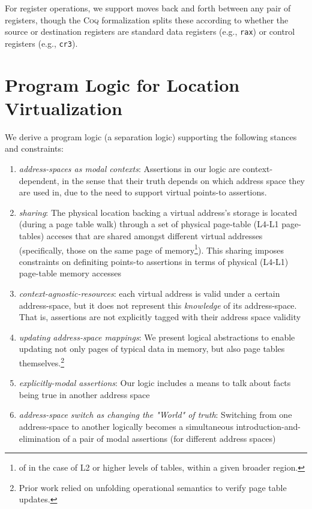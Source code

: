\documentclass[acmsmall,screen,nonacm]{acmart}
\newcommand{\singletonMap}[2]{[#1 := #2]}
\newcommand{\coq}{\textsc{Coq}\xspace}
\begin{document}
For register operations, we support moves back and forth between any pair of registers, though the \coq formalization splits these according to whether
the source or destination registers are standard data registers (e.g., \lstinline|rax|) or control registers (e.g., \lstinline|cr3|).
%
%
%
%
%
%
%
%
%
%
%
%
%
%
%
%
%
%
%
%
%
\section{Program Logic for Location Virtualization}
\label{sec:logic}
%
\newcommand{\gammaPred}{\delta}
\newcommand{\gammaPreds}{\delta\textsf{s}}
\newcommand{\rtv}{\textsf{rtv}}
\newcommand{\qone}{\texttt{q1}}
\newcommand{\qtwo}{\texttt{q2}}
\newcommand{\qthree}{\texttt{q3}}
\newcommand{\qfour}{\texttt{q4}}

\newcommand{\sumwalkabs}[3]{
  \ownGhost\gammaPred{\authfrag{\singletonMap{#1}{(#2, #3)}}}
}

\newcommand{\sumapaces}[2]{
  \ownGhost\gammaPreds{\authfrag{\singletonMap{#1}{#2}}}
}
\newcommand{\ptableabswalk}[1]{\mathcal{A}\textsf{bsPTableWalk}(#1)}
\newcommand{\ptablestore}{\theta}

We derive a program logic (a separation logic) supporting the following stances and constraints:
\begin{enumerate}
\item \textit{address-spaces as modal contexts}: Assertions in our logic are context-dependent,
  in the sense that their truth depends on which address space they are used in, due to the need to support virtual points-to assertions.
\item \textit{sharing}: The physical location backing a virtual address's storage is located (during a page table walk) through a 
      set of physical page-table (L4-L1 page-tables) acceses that are shared amongst different virtual addresses (specifically,
      those on the same page of memory\footnote{of in the case of L2 or higher levels of tables, within a given broader region.}).
      This sharing imposes constraints on definiting points-to assertions
      in terms of physical (L4-L1) page-table memory accesses
\item \textit{context-agnostic-resources}: each virtual address is valid under a certain address-space, 
      but it does not represent this \textit{knowledge} of its address-space. 
      That is, assertions are not explicitly tagged with their address space validity
\item \textit{updating address-space mappings}: We present logical abstractions to enable 
      updating not only pages of typical data in memory, but also page tables themselves.\footnote{Prior work relied on unfolding operational semantics
      to verify page table updates.}
\item \textit{explicitly-modal assertions}: Our logic includes a means to talk about facts being true
      in another address space
\item \textit{address-space switch as changing the "World" of truth}: Switching from one address-space to another logically
      becomes a simultaneous introduction-and-elimination of a pair of modal assertions (for different address spaces)
\end{enumerate}
\end{document}
